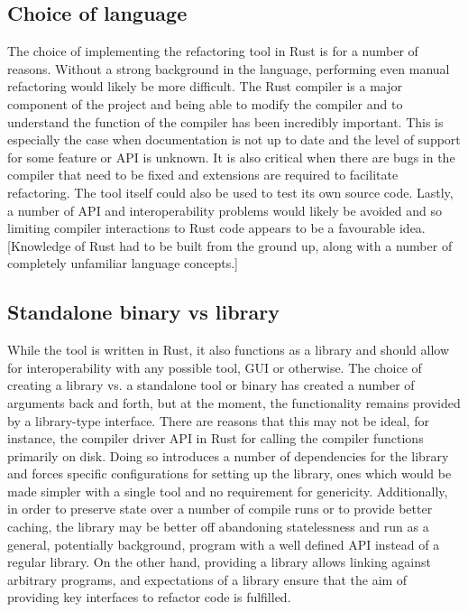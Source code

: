 \subsection{Choice of language}
The choice of implementing the refactoring tool in Rust is for a number of reasons. Without a strong background in the language, performing even manual refactoring would likely be more difficult. The Rust compiler is a major component of the project and being able to modify the compiler and to understand the function of the compiler has been incredibly important. This is especially the case when documentation is not up to date and the level of support for some feature or API is unknown. It is also critical when there are bugs in the compiler that need to be fixed and extensions are required to facilitate refactoring. The tool itself could also be used to test its own source code. Lastly, a number of API and interoperability problems would likely be avoided and so limiting compiler interactions to Rust code appears to be a favourable idea. [Knowledge of Rust had to be built from the ground up, along with a number of completely unfamiliar language concepts.]

\subsection{Standalone binary vs library}
While the tool is written in Rust, it also functions as a library and should allow for interoperability with any possible tool, GUI or otherwise. The choice of creating a library vs. a standalone tool or binary has created a number of arguments back and forth, but at the moment, the functionality remains provided by a library-type interface. There are reasons that this may not be ideal, for instance, the compiler driver API in Rust for calling the compiler functions primarily on disk. Doing so introduces a number of dependencies for the library and forces specific configurations for setting up the library, ones which would be made simpler with a single tool and no requirement for genericity. Additionally, in order to preserve state over a number of compile runs or to provide better caching, the library may be better off abandoning statelessness and run as a general, potentially background, program with a well defined API instead of a regular library. On the other hand, providing a library allows linking against arbitrary programs, and expectations of a library ensure that the aim of providing key interfaces to refactor code is fulfilled.

